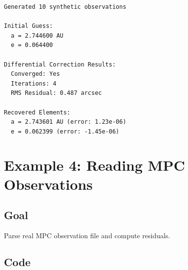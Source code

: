 \begin{lstlisting}[style=output]
Generated 10 synthetic observations

Initial Guess:
  a = 2.744600 AU
  e = 0.064400

Differential Correction Results:
  Converged: Yes
  Iterations: 4
  RMS Residual: 0.487 arcsec

Recovered Elements:
  a = 2.743601 AU (error: 1.23e-06)
  e = 0.062399 (error: -1.45e-06)
\end{lstlisting}

\section{Example 4: Reading MPC Observations}

\subsection{Goal}

Parse real MPC observation file and compute residuals.

\subsection{Code}

